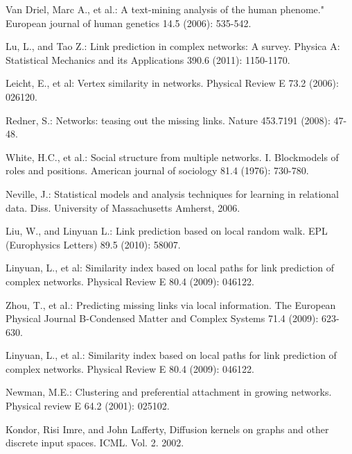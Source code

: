 \documentclass{article}
\begin{document}


\begin{thebibliography}{}

 Van Driel, Marc A., et al.: A text-mining analysis of the human phenome." European journal of human genetics 14.5 (2006): 535-542.

 Lu, L., and Tao Z.: Link prediction in complex networks: A survey. Physica A: Statistical Mechanics and its Applications 390.6 (2011): 1150-1170.

 Leicht, E., et al: Vertex similarity in networks. Physical Review E 73.2 (2006): 026120.

 Redner, S.: Networks: teasing out the missing links. Nature 453.7191 (2008): 47-48.

 White, H.C., et al.: Social structure from multiple networks. I. Blockmodels of roles and positions. American journal of sociology 81.4 (1976): 730-780.

 Neville, J.: Statistical models and analysis techniques for learning in relational data. Diss. University of Massachusetts Amherst, 2006.

 Liu, W., and Linyuan L.: Link prediction based on local random walk. EPL (Europhysics Letters) 89.5 (2010): 58007.

 Linyuan, L., et al: Similarity index based on local paths for link prediction of complex networks. Physical Review E 80.4 (2009): 046122.

 Zhou, T., et al.: Predicting missing links via local information. The European Physical Journal B-Condensed Matter and Complex Systems 71.4 (2009): 623-630.

 Linyuan, L., et al.: Similarity index based on local paths for link prediction of complex networks. Physical Review E 80.4 (2009): 046122.

 Newman, M.E.: Clustering and preferential attachment in growing networks. Physical review E 64.2 (2001): 025102.

 Kondor, Risi Imre, and John Lafferty, Diffusion kernels on graphs and other discrete input spaces. ICML. Vol. 2. 2002.


\end{thebibliography}
\end{document}
